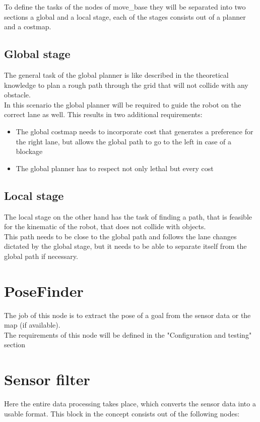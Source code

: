 To define the tasks of the nodes of move\_base they will be separated into two sections a global and a local stage, each of the stages consists out of a planner and a costmap.\\
\subsection{Global stage}
The general task of the global planner is like described in the theoretical knowledge to plan a rough path through the grid that will not collide with any obstacle.\\

In this scenario the global planner will be required to guide the robot on the correct lane as well. This results in two additional requirements:

\begin{itemize}
	\item The global costmap needs to incorporate cost that generates a preference for the right lane, but allows the global path to go to the left in case of a blockage
	\item The global planner has to respect not only lethal but every cost
\end{itemize}

\subsection{Local stage}
The local stage on the other hand has the task of finding a path, that is feasible for the kinematic of the robot, that does not collide with objects.\\
This path needs to be close to the global path and follows the lane changes dictated by the global stage, but it needs to be able to separate itself from the global path if necessary.

\section{PoseFinder}
The job of this node is to extract the pose of a goal from the sensor data or the map (if available).\\

The requirements of this node will be defined in the "Configuration and testing" section
\section{Sensor filter}
Here the entire data processing takes place, which converts the sensor data into a usable format. This block in the concept consists out of the following nodes:

